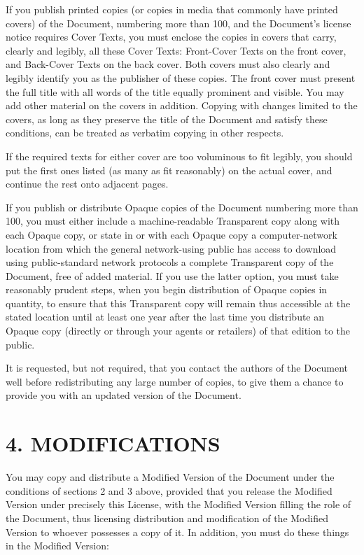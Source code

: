 \documentclass[captions=tableheading]{scrbook}
\begin{document}
If you publish printed copies (or copies in media that commonly have printed covers) of the Document, numbering more than 100, and the Document's license notice requires Cover Texts, you must enclose the copies in covers that carry, clearly and legibly, all these Cover Texts: Front-Cover Texts on the front cover, and Back-Cover Texts on the back cover. Both covers must also clearly and legibly identify you as the publisher of these copies. The front cover must present the full title with all words of the title equally prominent and visible. You may add other material on the covers in addition. Copying with changes limited to the covers, as long as they preserve the title of the Document and satisfy these conditions, can be treated as verbatim copying in other respects.

If the required texts for either cover are too voluminous to fit legibly, you should put the first ones listed (as many as fit reasonably) on the actual cover, and continue the rest onto adjacent pages.

If you publish or distribute Opaque copies of the Document numbering more than 100, you must either include a machine-readable Transparent copy along with each Opaque copy, or state in or with each Opaque copy a computer-network location from which the general network-using public has access to download using public-standard network protocols a complete Transparent copy of the Document, free of added material. If you use the latter option, you must take reasonably prudent steps, when you begin distribution of Opaque copies in quantity, to ensure that this Transparent copy will remain thus accessible at the stated location until at least one year after the last time you distribute an Opaque copy (directly or through your agents or retailers) of that edition to the public.

It is requested, but not required, that you contact the authors of the Document well before redistributing any large number of copies, to give them a chance to provide you with an updated version of the Document.
\section{4. MODIFICATIONS}
\label{sec-18-5}


You may copy and distribute a Modified Version of the Document under the conditions of sections 2 and 3 above, provided that you release the Modified Version under precisely this License, with the Modified Version filling the role of the Document, thus licensing distribution and modification of the Modified Version to whoever possesses a copy of it. In addition, you must do these things in the Modified Version:
\end{document}
